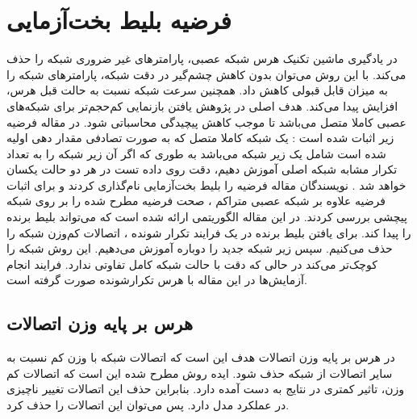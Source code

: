 \section{فرضیه بلیط بخت‌آزمایی 
} 
در یادگیری ماشین تکنیک هرس 
شبکه عصبی، پارامتر‌های غیر ضروری شبکه را حذف می‌کند. با این روش می‌توان بدون کاهش چشم‌گیر در دقت شبکه، پارامتر‌های شبکه را به میزان قابل قبولی کاهش داد.  همچنین سرعت شبکه نسبت به حالت قبل هرس، افزایش پیدا می‌کند.
هدف اصلی در پژوهش یافتن بازنمایی کم‌حجم‌تر برای شبکه‌های عصبی کاملا متصل
می‌باشد تا موجب کاهش پیچیدگی محاسباتی شود. در مقاله فرضیه زیر اثبات شده است :
یک شبکه کاملا متصل که به صورت تصادفی مقدار دهی اولیه شده است
شامل یک زیر شبکه
می‌باشد به طوری که اگر آن زیر شبکه را به تعداد تکرار
مشابه شبکه اصلی آموزش دهیم، دقت روی داده تست در هر دو حالت یکسان خواهد شد \cite{frankle2019lottery}.
\newline \newline
نویسندگان مقاله فرضیه را بلیط بخت‌آزمایی
نام‌گذاری کردند و برای اثبات فرضیه علاوه بر شبکه عصبی متراکم
،
صحت فرضیه مطرح شده را بر روی شبکه پیچشی
بررسی کردند. در این مقاله الگوریتمی ارائه شده است که می‌تواند بلیط برنده 
را پیدا کند. برای یافتن بلیط برنده در یک فرایند تکرار شونده
، اتصالات کم‌وزن شبکه را حذف می‌کنیم. سپس زیر شبکه جدید را دوباره آموزش می‌دهیم. این روش شبکه را کوچک‌‌تر می‌کند در حالی که دقت با حالت شبکه کامل تفاوتی ندارد. فرایند انجام آزمایش‌ها در این مقاله با هرس تکرارشونده
صورت گرفته است.


\subsection{هرس بر پایه وزن اتصالات}
در هرس بر پایه وزن اتصالات
هدف این است که اتصالات شبکه با وزن کم نسبت به سایر اتصالات از شبکه حذف شود. ایده روش مطرح شده این است که اتصالات کم وزن، تاثیر کمتری در نتایج به دست آمده دارد. بنابراین حذف این اتصالات تغییر ناچیزی در عملکرد مدل دارد. پس می‌توان این اتصالات را حذف کرد.

